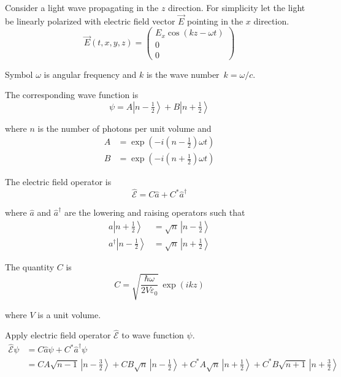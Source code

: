 \documentclass[12pt]{article}
\begin{document}
\noindent
Consider a light wave propagating in the $z$ direction.
For simplicity let the light be linearly polarized with electric
field vector $\vec{E}$ pointing in the $x$ direction.
\begin{equation*}
\vec{E}(t,x,y,z)=\begin{pmatrix}E_x\cos(kz-\omega t)\\0\\0\end{pmatrix}
\end{equation*}

\noindent
Symbol $\omega$ is angular frequency and $k$ is the wave number~$k=\omega/c$.

\bigskip
\noindent
The corresponding wave function is
\begin{equation*}
\psi=A\left|n-\tfrac{1}{2}\right\rangle
+B\left|n+\tfrac{1}{2}\right\rangle
\end{equation*}

\noindent
where $n$ is the number of photons per unit volume and
\begin{align*}
A&=\exp\left(-i\left(n-\tfrac{1}{2}\right)\omega t\right)\\
B&=\exp\left(-i\left(n+\tfrac{1}{2}\right)\omega t\right)
\end{align*}

\noindent
The electric field operator is
\begin{equation*}
\hat{\mathscr{E}}=C\hat{a}+C^*\hat{a}^\dagger
\end{equation*}

\noindent
where $\hat{a}$ and $\hat{a}^\dagger$ are the lowering and raising operators such that
\begin{align*}
a\left|n+\tfrac{1}{2}\right\rangle&=\sqrt{n}\,\left|n-\tfrac{1}{2}\right\rangle\\
a^\dagger\left|n-\tfrac{1}{2}\right\rangle&=\sqrt{n}\,\left|n+\tfrac{1}{2}\right\rangle
\end{align*}

\noindent
The quantity $C$ is
\begin{equation*}
C=\sqrt{\frac{\hbar\omega}{2V\varepsilon_0}}\,\exp(ikz)
\end{equation*}

\noindent
where $V$ is a unit volume.

\bigskip
\noindent
Apply electric field operator $\hat{\mathscr{E}}$ to wave function $\psi$.
\begin{align*}
\hat{\mathscr{E}}\psi
&=C\hat{a}\psi+C^*\hat{a}^\dagger\psi\\
&=CA\sqrt{n-1}\,\left|n-\tfrac{3}{2}\right\rangle+CB\sqrt{n}\,\left|n-\tfrac{1}{2}\right\rangle
+C^*A\sqrt{n}\,\left|n+\tfrac{1}{2}\right\rangle+C^*B\sqrt{n+1}\,\left|n+\tfrac{3}{2}\right\rangle
\end{align*}
\end{document}
